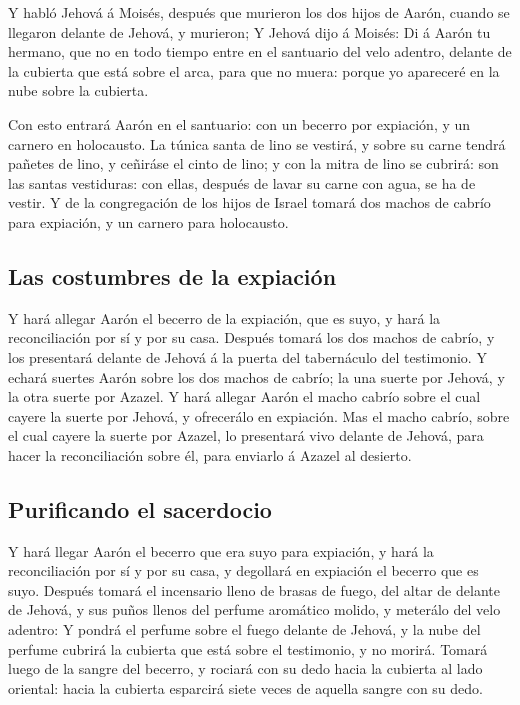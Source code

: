  Y habló Jehová á Moisés, después que murieron los dos
hijos de Aarón, cuando se llegaron delante de Jehová, y murieron;
 Y Jehová dijo á Moisés: Di á Aarón tu hermano, que no en
todo tiempo entre en el santuario del velo adentro, delante de la
cubierta que está sobre el arca, para que no muera: porque yo apareceré
en la nube sobre la cubierta.

 Con esto entrará Aarón en el santuario: con un becerro
por expiación, y un carnero en holocausto.  La túnica
santa de lino se vestirá, y sobre su carne tendrá pañetes de lino, y
ceñiráse el cinto de lino; y con la mitra de lino se cubrirá: son las
santas vestiduras: con ellas, después de lavar su carne con agua, se ha
de vestir.  Y de la congregación de los hijos de Israel
tomará dos machos de cabrío para expiación, y un carnero para
holocausto.

\hypertarget{las-costumbres-de-la-expiaciuxf3n}{%
\subsection{Las costumbres de la
expiación}\label{las-costumbres-de-la-expiaciuxf3n}}

 Y hará allegar Aarón el becerro de la expiación, que es
suyo, y hará la reconciliación por sí y por su casa. 
Después tomará los dos machos de cabrío, y los presentará delante de
Jehová á la puerta del tabernáculo del testimonio.  Y
echará suertes Aarón sobre los dos machos de cabrío; la una suerte por
Jehová, y la otra suerte por Azazel.  Y hará allegar Aarón
el macho cabrío sobre el cual cayere la suerte por Jehová, y ofrecerálo
en expiación.  Mas el macho cabrío, sobre el cual cayere
la suerte por Azazel, lo presentará vivo delante de Jehová, para hacer
la reconciliación sobre él, para enviarlo á Azazel al desierto.

\hypertarget{purificando-el-sacerdocio}{%
\subsection{Purificando el sacerdocio}\label{purificando-el-sacerdocio}}

 Y hará llegar Aarón el becerro que era suyo para
expiación, y hará la reconciliación por sí y por su casa, y degollará en
expiación el becerro que es suyo.  Después tomará el
incensario lleno de brasas de fuego, del altar de delante de Jehová, y
sus puños llenos del perfume aromático molido, y meterálo del velo
adentro:  Y pondrá el perfume sobre el fuego delante de
Jehová, y la nube del perfume cubrirá la cubierta que está sobre el
testimonio, y no morirá.  Tomará luego de la sangre del
becerro, y rociará con su dedo hacia la cubierta al lado oriental: hacia
la cubierta esparcirá siete veces de aquella sangre con su dedo.

